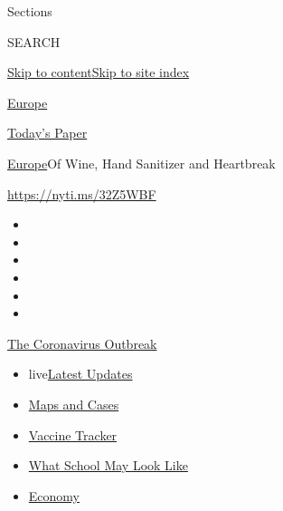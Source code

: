 Sections

SEARCH

\protect\hyperlink{site-content}{Skip to
content}\protect\hyperlink{site-index}{Skip to site index}

\href{https://www.nytimes3xbfgragh.onion/section/world/europe}{Europe}

\href{https://myaccount.nytimes3xbfgragh.onion/auth/login?response_type=cookie\&client_id=vi}{}

\href{https://www.nytimes3xbfgragh.onion/section/todayspaper}{Today's
Paper}

\href{/section/world/europe}{Europe}\textbar{}Of Wine, Hand Sanitizer
and Heartbreak

\url{https://nyti.ms/32Z5WBF}

\begin{itemize}
\item
\item
\item
\item
\item
\item
\end{itemize}

\href{https://www.nytimes3xbfgragh.onion/news-event/coronavirus?action=click\&pgtype=Article\&state=default\&region=TOP_BANNER\&context=storylines_menu}{The
Coronavirus Outbreak}

\begin{itemize}
\tightlist
\item
  live\href{https://www.nytimes3xbfgragh.onion/2020/08/02/world/coronavirus-updates.html?action=click\&pgtype=Article\&state=default\&region=TOP_BANNER\&context=storylines_menu}{Latest
  Updates}
\item
  \href{https://www.nytimes3xbfgragh.onion/interactive/2020/us/coronavirus-us-cases.html?action=click\&pgtype=Article\&state=default\&region=TOP_BANNER\&context=storylines_menu}{Maps
  and Cases}
\item
  \href{https://www.nytimes3xbfgragh.onion/interactive/2020/science/coronavirus-vaccine-tracker.html?action=click\&pgtype=Article\&state=default\&region=TOP_BANNER\&context=storylines_menu}{Vaccine
  Tracker}
\item
  \href{https://www.nytimes3xbfgragh.onion/interactive/2020/07/29/us/schools-reopening-coronavirus.html?action=click\&pgtype=Article\&state=default\&region=TOP_BANNER\&context=storylines_menu}{What
  School May Look Like}
\item
  \href{https://www.nytimes3xbfgragh.onion/live/2020/07/31/business/stock-market-today-coronavirus?action=click\&pgtype=Article\&state=default\&region=TOP_BANNER\&context=storylines_menu}{Economy}
\end{itemize}

